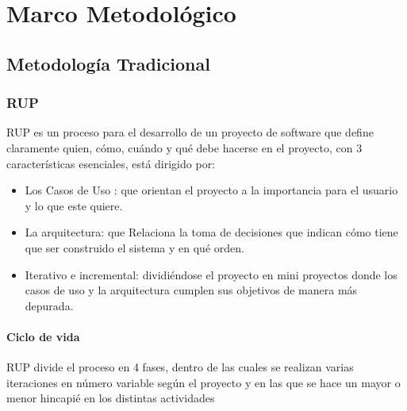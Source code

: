\chapter{Marco Metodológico}


\section{Metodología Tradicional} 
\subsection{RUP}

 RUP es un proceso para el desarrollo de un proyecto de software que define claramente quien, cómo, cuándo y qué debe hacerse en el proyecto, con 3 características esenciales, está dirigido por:

\begin{itemize}

    \item Los Casos de Uso : que orientan el proyecto a la importancia para el usuario y lo que este quiere. 

    \item La arquitectura: que Relaciona la toma de decisiones que indican cómo tiene que ser construido el sistema y en qué orden.

    \item Iterativo e incremental: dividiéndose el proyecto en mini proyectos donde los casos de uso y la arquitectura cumplen sus objetivos de manera más depurada.

\end{itemize}


\subsubsection{Ciclo de vida}
    RUP divide el proceso en 4 fases, dentro de las cuales se realizan varias iteraciones en número variable según el proyecto y en las que se hace un mayor o menor hincapié en los distintas actividades

